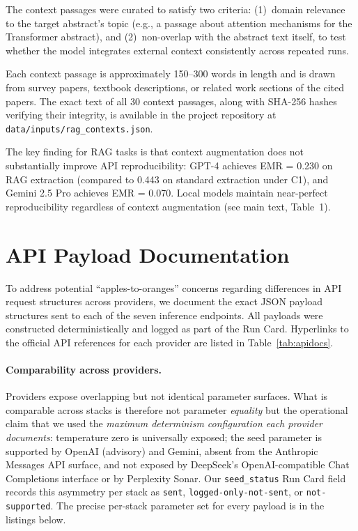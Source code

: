 \documentclass[11pt]{article}
\begin{document}
The context passages were curated to satisfy two criteria: (1)~domain relevance to the target abstract's topic (e.g., a passage about attention mechanisms for the Transformer abstract), and (2)~non-overlap with the abstract text itself, to test whether the model integrates external context consistently across repeated runs.

Each context passage is approximately 150--300 words in length and is drawn from survey papers, textbook descriptions, or related work sections of the cited papers. The exact text of all 30 context passages, along with SHA-256 hashes verifying their integrity, is available in the project repository at \texttt{data/inputs/rag\_contexts.json}.

The key finding for RAG tasks is that context augmentation does not substantially improve API reproducibility: GPT-4 achieves EMR = 0.230 on RAG extraction (compared to 0.443 on standard extraction under C1), and Gemini 2.5 Pro achieves EMR = 0.070. Local models maintain near-perfect reproducibility regardless of context augmentation (see main text, Table~1).


\section{API Payload Documentation}
\label{sec:s4}

To address potential ``apples-to-oranges'' concerns regarding differences in API request structures across providers, we document the exact JSON payload structures sent to each of the seven inference endpoints. All payloads were constructed deterministically and logged as part of the Run Card. Hyperlinks to the official API references for each provider are listed in Table~\ref{tab:apidocs}.

\paragraph{Comparability across providers.}
Providers expose overlapping but not identical parameter surfaces. What is comparable across stacks is therefore not parameter \emph{equality} but the operational claim that we used the \emph{maximum determinism configuration each provider documents}: temperature zero is universally exposed; the seed parameter is supported by OpenAI (advisory) and Gemini, absent from the Anthropic Messages API surface, and not exposed by DeepSeek's OpenAI-compatible Chat Completions interface or by Perplexity Sonar. Our \texttt{seed\_status} Run Card field records this asymmetry per stack as \texttt{sent}, \texttt{logged-only-not-sent}, or \texttt{not-supported}. The precise per-stack parameter set for every payload is in the listings below.
\end{document}
